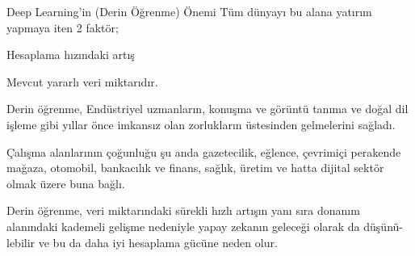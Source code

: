 \documentclass{beamer}                                                                                          %
\begin{document}

	\begin{frame}{Deep Learning'in (Derin Öğrenme) Önemi}
	        \justifying
	        \color{myred1} \color{black}Tüm dünyayı bu alana yatırım yapmaya iten 2 faktör;\par \vspace{5} \hspace{0.5cm} \color{myred1} \color{black}Hesaplama hızındaki artış\par \vspace{5} \hspace{0.5cm} \color{myred1} \color{black}Mevcut yararlı veri miktarıdır.\par \vspace{25}
	        \color{myred1} \color{black}Derin öğrenme, Endüstriyel uzmanların, konuşma ve görüntü tanıma ve doğal dil işleme gibi yıllar önce imkansız olan zorlukların üstesinden gelmelerini sağladı.\newline
            

    \end{frame}
    
	
	\begin{frame}{}
	        \justifying
	        \color{myred1} \color{black}Çalışma alanlarının çoğunluğu şu anda gazetecilik, eğlence, çevrimiçi perakende mağaza, otomobil, bankacılık ve finans, sağlık, üretim ve hatta dijital sektör olmak üzere buna bağlı.\par \vspace{25}
            \color{myred1} \color{black}Derin öğrenme, veri miktarındaki sürekli hızlı artışın yanı sıra donanım alanındaki kademeli gelişme nedeniyle yapay zekanın geleceği olarak da düşünü-
            lebilir ve bu da daha iyi hesaplama gücüne neden olur.
    \end{frame}
    
\end{document}
